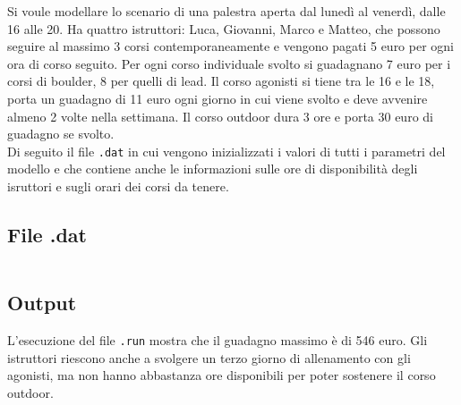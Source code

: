 Si voule modellare lo scenario di una palestra aperta dal lunedì al venerdì, dalle 16 alle 20. Ha quattro istruttori: Luca, Giovanni, Marco e Matteo, che possono seguire al massimo 3 corsi contemporaneamente e vengono pagati 5 euro per ogni ora di corso seguito. Per ogni corso individuale svolto si guadagnano 7 euro per i corsi di boulder, 8 per quelli di lead. Il corso agonisti si tiene tra le 16 e le 18, porta un guadagno di 11 euro ogni giorno in cui viene svolto e deve avvenire almeno 2 volte nella settimana. Il corso outdoor dura 3 ore e porta 30 euro di guadagno se svolto. \\
Di seguito il file \texttt{.dat} in cui vengono inizializzati i valori di tutti i parametri del modello e che contiene anche le informazioni sulle ore di disponibilità degli isruttori e sugli orari dei corsi da tenere.

\subsection{File .dat}
\inputminted[bgcolor=bg, breaklines, fontsize=\small]{haskell}{opl/scenario-1.dat}

\subsection{Output}
L'esecuzione del file \texttt{.run} mostra che il guadagno massimo è di 546 euro. Gli istruttori riescono anche a svolgere un terzo giorno di allenamento con gli agonisti, ma non hanno abbastanza ore disponibili per poter sostenere il corso outdoor.
